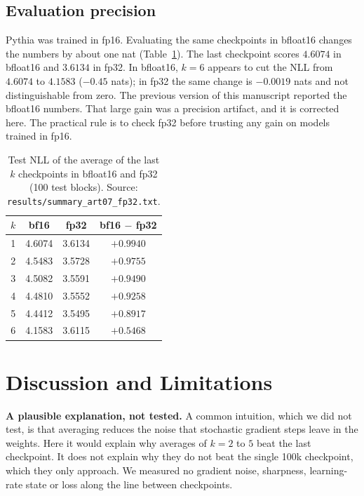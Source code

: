 \documentclass[conference]{IEEEtran}
\begin{document}
\subsection*{Evaluation precision}
Pythia was trained in fp16. Evaluating the same checkpoints in bfloat16 changes the numbers by about one nat (Table~\ref{tab:prec}). The last checkpoint scores $4.6074$ in bfloat16 and $3.6134$ in fp32. In bfloat16, $k=6$ appears to cut the NLL from $4.6074$ to $4.1583$ ($-0.45$ nats); in fp32 the same change is $-0.0019$ nats and not distinguishable from zero. The previous version of this manuscript reported the bfloat16 numbers. That large gain was a precision artifact, and it is corrected here. The practical rule is to check fp32 before trusting any gain on models trained in fp16.

\begin{table}[!t]
\caption{Test NLL of the average of the last $k$ checkpoints in bfloat16 and fp32 (100 test blocks). Source: \texttt{results/summary\_art07\_fp32.txt}.}
\label{tab:prec}
\centering
\small
\begin{tabular}{cccc}
\toprule
$k$ & bf16 & fp32 & bf16 $-$ fp32 \\
\midrule
1 & 4.6074 & 3.6134 & $+0.9940$ \\
2 & 4.5483 & 3.5728 & $+0.9755$ \\
3 & 4.5082 & 3.5591 & $+0.9490$ \\
4 & 4.4810 & 3.5552 & $+0.9258$ \\
5 & 4.4412 & 3.5495 & $+0.8917$ \\
6 & 4.1583 & 3.6115 & $+0.5468$ \\
\bottomrule
\end{tabular}
\end{table}

\section{Discussion and Limitations}
\textbf{A plausible explanation, not tested.} A common intuition, which we did not test, is that averaging reduces the noise that stochastic gradient steps leave in the weights. Here it would explain why averages of $k=2$ to $5$ beat the last checkpoint. It does not explain why they do not beat the single 100k checkpoint, which they only approach. We measured no gradient noise, sharpness, learning-rate state or loss along the line between checkpoints.
\end{document}
